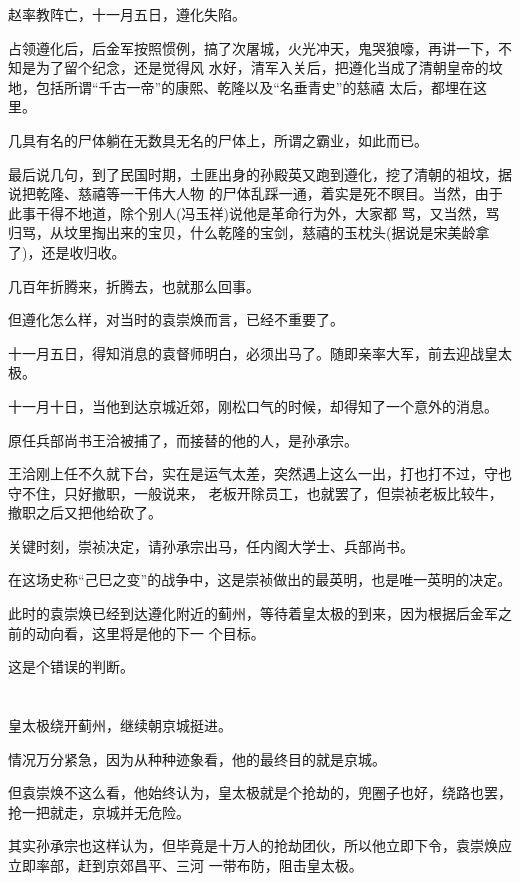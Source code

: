 \documentclass[11pt,a4paper,onecolumn]{article}
\begin{document}
赵率教阵亡，十一月五日，遵化失陷。

占领遵化后，后金军按照惯例，搞了次屠城，火光冲天，鬼哭狼嚎，再讲一下，不知是为了留个纪念，还是觉得风
水好，清军入关后，把遵化当成了清朝皇帝的坟地，包括所谓``千古一帝''的康熙、乾隆以及``名垂青史''的慈禧
太后，都埋在这里。

几具有名的尸体躺在无数具无名的尸体上，所谓之霸业，如此而已。

最后说几句，到了民国时期，土匪出身的孙殿英又跑到遵化，挖了清朝的祖坟，据说把乾隆、慈禧等一干伟大人物
的尸体乱踩一通，着实是死不瞑目。当然，由于此事干得不地道，除个别人(冯玉祥)说他是革命行为外，大家都
骂，又当然，骂归骂，从坟里掏出来的宝贝，什么乾隆的宝剑，慈禧的玉枕头(据说是宋美龄拿了)，还是收归收。

几百年折腾来，折腾去，也就那么回事。

但遵化怎么样，对当时的袁崇焕而言，已经不重要了。

十一月五日，得知消息的袁督师明白，必须出马了。随即亲率大军，前去迎战皇太极。

十一月十日，当他到达京城近郊，刚松口气的时候，却得知了一个意外的消息。

原任兵部尚书王洽被捕了，而接替的他的人，是孙承宗。

王洽刚上任不久就下台，实在是运气太差，突然遇上这么一出，打也打不过，守也守不住，只好撤职，一般说来，
老板开除员工，也就罢了，但崇祯老板比较牛，撤职之后又把他给砍了。

关键时刻，崇祯决定，请孙承宗出马，任内阁大学士、兵部尚书。

在这场史称``己巳之变''的战争中，这是崇祯做出的最英明，也是唯一英明的决定。

此时的袁崇焕已经到达遵化附近的蓟州，等待着皇太极的到来，因为根据后金军之前的动向看，这里将是他的下一
个目标。

这是个错误的判断。

\section[\thesection]{}

皇太极绕开蓟州，继续朝京城挺进。

情况万分紧急，因为从种种迹象看，他的最终目的就是京城。

但袁崇焕不这么看，他始终认为，皇太极就是个抢劫的，兜圈子也好，绕路也罢，抢一把就走，京城并无危险。

其实孙承宗也这样认为，但毕竟是十万人的抢劫团伙，所以他立即下令，袁崇焕应立即率部，赶到京郊昌平、三河
一带布防，阻击皇太极。
\end{document}
